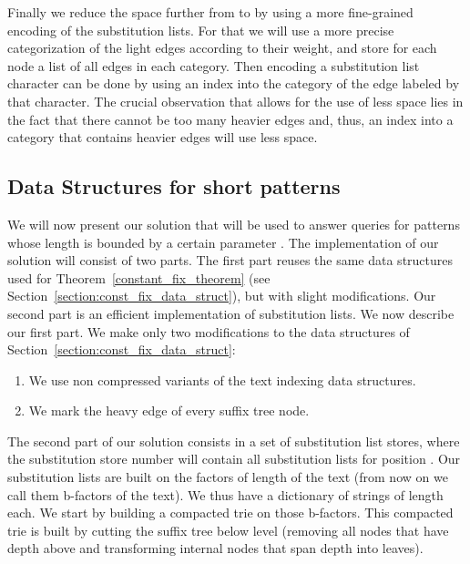 \documentclass{article}
\newcommand{\?}{\mskip1.5mu}
\begin{document}
Finally we reduce the space further from  to  by using a more fine-grained encoding of the substitution lists. For that we will use a more precise categorization of the light edges according to their weight, and store for each node a list of all edges in each category. Then encoding a substitution list character can be done by using an index into the category of the edge labeled by that character. The crucial observation that allows for the use of less space lies in the fact that there cannot be too many heavier edges and, thus, an index into a category that contains heavier edges will use less space. 

\subsection{Data Structures for short patterns}
\label{section:DS_impl}

We will now present our solution that will be used to answer queries for patterns whose length is bounded by a certain parameter . The implementation of our solution will consist of two parts. The first part reuses the same data structures used for Theorem~\ref{constant_fix_theorem} (see Section~\ref{section:const_fix_data_struct}), but with slight modifications. Our second part is an efficient implementation of substitution lists. We now describe our first part. We make only two modifications to the data structures of Section~\ref{section:const_fix_data_struct}: 
\begin{enumerate}
\item We use non compressed variants of the text indexing data structures. 
\item We mark the heavy edge of every suffix tree node. 
\end{enumerate}

The second part of our solution consists in a set of  substitution list stores, where the substitution store number  will contain all substitution lists for position . 
Our substitution lists are built on the factors of length  of the text (from now on we call them b-factors of the text). We thus have a dictionary of  strings of length  each. 
We start by building a compacted trie on those b-factors. This compacted trie is built by cutting the suffix tree below level  (removing all nodes that have depth above  and transforming internal nodes that span depth  into leaves). 
\end{document}

